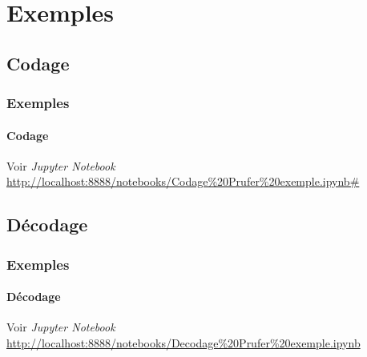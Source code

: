 \documentclass[11pt]{beamer}
\begin{document}
\section{Exemples}

\subsection{Codage}
\begin{frame}
\end{frame}

\begin{frame}
\frametitle{Exemples}
\framesubtitle{Codage}

\begin{center}
Voir \textit{Jupyter Notebook}\\
\vspace{3cm}
\tiny{\url{http://localhost:8888/notebooks/Codage\%20Prufer\%20exemple.ipynb\#}}
\end{center}
\end{frame}

\subsection{Décodage}
\begin{frame}
\end{frame}

\begin{frame}
\frametitle{Exemples}
\framesubtitle{Décodage}

\begin{center}
Voir \textit{Jupyter Notebook}\\
\vspace{3cm}
\tiny{\url{http://localhost:8888/notebooks/Decodage\%20Prufer\%20exemple.ipynb}}
\end{center}
\end{frame}
\end{document}
